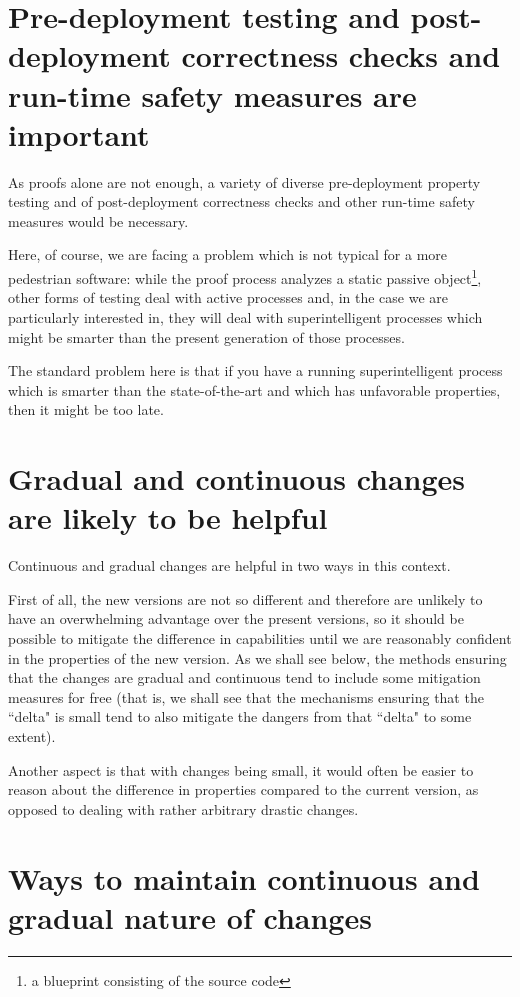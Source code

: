 \documentclass{article}
\begin{document}
\section{Pre-deployment testing and post-deployment correctness checks and run-time safety measures are important}\label{sec:testing}

As proofs alone are not enough, a variety of diverse pre-deployment property testing and of post-deployment correctness checks
and other run-time safety measures would be necessary.

Here, of course, we are facing a problem which is not typical for a more pedestrian software: while the proof process analyzes
a static passive object\footnote{a blueprint consisting of the source code}, other forms of testing deal with active processes and, 
in the case we are particularly interested in, they will deal with superintelligent processes which might be smarter 
than the present generation of those processes.

The standard problem here is that if you have a running superintelligent process which is smarter than the state-of-the-art and
which has unfavorable properties, then it might be too late.

\section{Gradual and continuous changes are likely to be helpful}\label{sec:gradual}

Continuous and gradual changes are helpful in two ways in this context.

First of all, the new versions are not so different and therefore are unlikely to have an overwhelming advantage over the present versions,
so it should be possible to mitigate the difference in capabilities until we are reasonably confident in the properties of
the new version. As we shall see below, the methods ensuring that the changes are gradual and continuous tend to
include some mitigation measures for free (that is, we shall see that the mechanisms ensuring that the ``delta" is small
tend to also mitigate the dangers from that ``delta" to some extent).

Another aspect is that with changes being small, it would often be easier to reason about the difference in properties
compared to the current version, as opposed to dealing with rather arbitrary drastic changes.

\section{Ways to maintain continuous and gradual nature of changes}\label{sec:ways}
\end{document}
